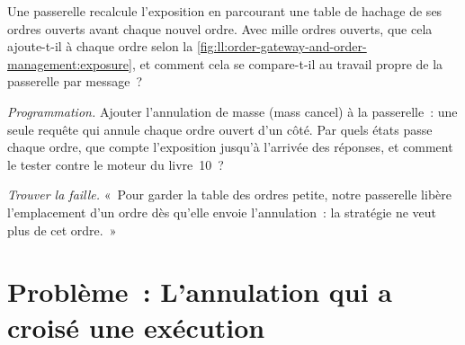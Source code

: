 \begin{exercise}[$\star\star$]\label{exo:ll:order-gateway-and-order-management:6}
Une passerelle recalcule l'exposition en parcourant une table de hachage de ses ordres ouverts avant chaque nouvel ordre. Avec mille ordres ouverts,
que cela ajoute-t-il à chaque ordre selon la \cref{fig:ll:order-gateway-and-order-management:exposure}, et comment cela se compare-t-il
au travail propre de la passerelle par message~?
\end{exercise}

\begin{exercise}[$\star\star\star$]\label{exo:ll:order-gateway-and-order-management:7}
\emph{Programmation.} Ajouter l'annulation de masse (mass cancel) à la passerelle~: une seule requête qui annule chaque ordre ouvert d'un côté. Par quels états passe chaque ordre,
que compte l'exposition jusqu'à l'arrivée des réponses, et comment le tester contre le moteur du livre~10~?
\end{exercise}

\begin{exercise}[$\star\star\star$]\label{exo:ll:order-gateway-and-order-management:8}
\emph{Trouver la faille.} «~Pour garder la table des ordres petite, notre passerelle libère l'emplacement d'un ordre dès qu'elle
envoie l'annulation~: la stratégie ne veut plus de cet ordre.~»
\end{exercise}

\section{Problème~: L'annulation qui a croisé une exécution}

